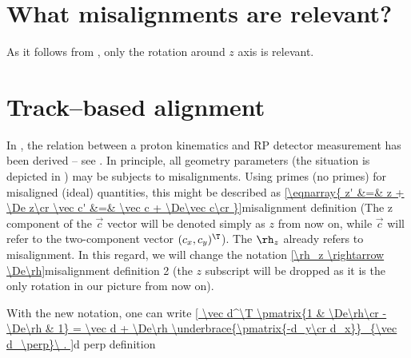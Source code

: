 
\section{What misalignments are relevant?}

As it follows from , only the rotation around $z$ axis is relevant.

\section{Track--based alignment}

In , the relation between a proton kinematics and RP detector measurement has been derived -- see . In principle, all geometry parameters (the situation is depicted in ) may be subjects to misalignments. Using primes (no primes) for misaligned (ideal) quantities, this might be described as
\eqref{\eqnarray{
z' &=& z + \De z\cr
\vec c' &=& \vec c + \De\vec c\cr
}}{misalignment definition}
(The z component of the $\vec c$ vector will be denoted simply as $z$ from now on, while $\vec c$ will refer to the two-component vector $(c_x, c_y)^\T$). The $\rh_z$ already refers to misalignment. In this regard, we will change the notation
\eqref{\rh_z \rightarrow \De\rh}{misalignment definition 2}
(the $z$ subscript will be dropped as it is the only rotation in our picture from now on).

With the new notation, one can write
\eqref{
\vec d^\T \pmatrix{1 & \De\rh\cr -\De\rh & 1} =
\vec d + \De\rh \underbrace{\pmatrix{-d_y\cr d_x}}_{\vec d_\perp}\ .
}{d perp definition}


